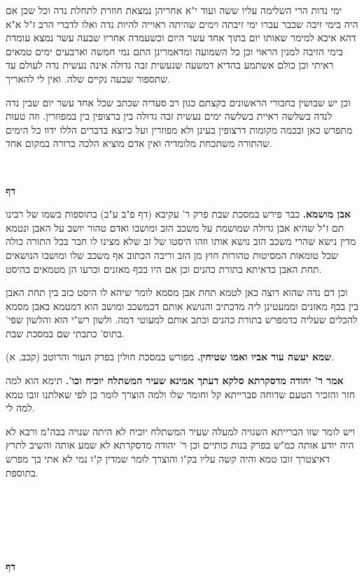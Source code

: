 \documentclass[12pt, openany]{book}
\newcommand{\sethebfont}{
\fontsize{10.5pt}{21.0pt} \selectfont
}
\newcommand{\twocol}[1]{
	{\sethebfont \begin{multicols}{2}
			#1
	\end{multicols}}	
}
\newcommand{\textblock}[1]{
{\sethebfont #1\\}	
}
\newcommand{\chapname}{}
\newcommand{\newchap}[1]{
	\addcontentsline{toc}{chapter}{#1}
	\renewcommand{\chapname}{#1}
		\begin{center}
			\textbf{%
\fontsize{16pt}{16pt}\selectfont
				#1}
		\end{center}
}
\begin{document}
{ימי נדות הרי השלימה עליו ששה ועוד י"א אחריהן נמצאת חוזרת לתחלת נדה וכל שכן אם היה בימי זיבה שכבר עברו ימי זיבתה וימים שהיתה ראוייה להיות נדה ואלו לדברי הרב ז"ל א"א דהא איכא למימר שאותו יום בתוך אחד עשר היום וכשעמדה אחריו שבעה עשר נמצא עומדת בימי הזיבה למנין הראוי וכן כל השמועה ומדאמרינן התם נמי חמשה וארבעים ימים טמאים ראיתי וכן כולם אשתמע בהדיא דמשעה שנעשית זבה גדולה אינה נעשית נדה לעולם עד שתספור שבעה נקיים שלה. ואין לי להאריך.\par  וכן יש שבושין בחבורי הראשונים בקצתם כגון רב סעדיה שכתב שכל אחד עשר יום שבין נדה לנדה בשלשה ראיית בשלשה ימים נעשית זבה גדולה בין ברצופין בין במפוזרין. וזה טעות מתפרש כאן ובכמה מקומות דרצופין בעינן ולא מפוזרין ועל כיוצא בדברים הללו ידוו כל הימים שהתורה משתכחת מלומדיה ואין אדם מוציא הלכה ברורה במקום אחד. 
\par}
\textblock{}{}
\newchap{דף }
\twocol{\textbf{אבן מושמא.}  כבר פירש במסכת שבת פרק ר' עקיבא (דף פ"ב ע"ב) בתוספות בשמו של רבינו תם ז"ל שהיא אבן גדולה שמושמת על משכב הזב ומושבו ואדם טהור יושב על האבן ונטמא מדין נישא שהרי משכב הזב נושא אותו וזהו היסטו של זב שלא מצינו לו חבר בכל התורה כולה שכל טומאות המסיטות טהורות חוץ מן הזב וריבה הכתוב אף משכב שלו ומושבו הנושאים תחת האבן כדאיתא בתורת כהנים וכן אם היו בכף מאזנים וכרעו הן מטמאים בהיסט.\par  וכן דם נדה שהוא רוצה כאן לטמא תחת אבן מסמא לומר שיהא לו היסט כזב בין תחת האבן בין בכף מאזנים וממעטינן ליה מדכתיב והנושא אותם דכמשכב ומושב הוא דמטמא באבן מסמא להכלים שעליה כדמפרש בתורת כהנים וכתב אותם למעוטי דמה. ולשון רש"י הוא והלשון שפי' בתוס' כתבתי שם במסכת שבת. 
\par\textbf{שמא יעשה עור אביו ואמו שטיחין.}  מפורש במסכת חולין בפרק העור והרוטב (קכב, א). 
\par\textbf{אמר ר' יהודה מדסקרתא סלקא דעתך אמינא שעיר המשתלח יוכיח וכו'.}  תימא הוא למה חזר והזכיר הטעם שדוחה סברייתא קל וחומר שלו ולמה הוצרך לומר כן לפי שאלתנו זובו טמא למה לי.\par  ויש לומר שזו הברייתא השגויה למעלה שעיר המשתלח יוכיח לא היתה שנויה בבה"מ ורבא לא היה יודע אותה כמ"ש בפרק בנות כותיים וכן ר' יהודה מדסקרתא לא שמע אותה והשיב לתרץ דאיצטרך זובו טמא והיה קשה עליו בק"ו והוצרך לומר שמדין ק"ו נמי לא אתי בך מפרש בתוספת. 
\par}
\textblock{}{}
\textblock{}{}
\textblock{}{}
\newchap{דף }
\end{document}
